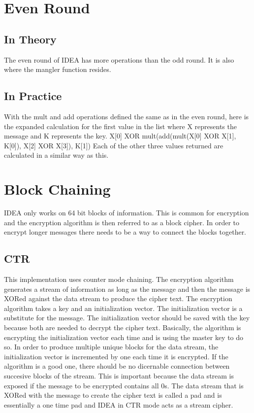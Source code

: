 \documentclass[12pt]{article}
\begin{document}
\section{Even Round}
\subsection{In Theory}
The even round of IDEA has more operations than the odd round. It is also where the mangler function resides. 
\subsection{In Practice}
With the mult and add operations defined the same as in the even round, here is the expanded calculation for the first value in the list where X represents the message and K represents the key. X[0] XOR mult(add(mult(X[0] XOR X[1], K[0]), X[2] XOR X[3]), K[1]) Each of the other three values returned are calculated in a similar way as this.
\section{Block Chaining}
IDEA only works on 64 bit blocks of information. This is common for encryption and the encryption algorithm is then referred to as a block cipher. In order to encrypt longer messages there needs to be a way to connect the blocks together.
\subsection{CTR}
This implementation uses counter mode chaining. The encryption algorithm generates a stream of information as long as the message and then the message is XORed against the data stream to produce the cipher text. The encryption algorithm takes a key and an initialization vector. The initialization vector is a substitute for the message. The initialization vector should be saved with the key because both are needed to decrypt the cipher text. Basically, the algorithm is encrypting the initialization vector each time and is using the master key to do so. In order to produce multiple unique blocks for the data stream, the initialization vector is incremented by one each time it is encrypted. If the algorithm is a good one, there should be no dicernable connection between succesive blocks of the stream. This is important because the data stream is exposed if the message to be encrypted contains all 0s. The data stream that is XORed with the message to create the cipher text is called a pad and is essentially a one time pad and IDEA in CTR mode acts as a stream cipher.
\end{document}
